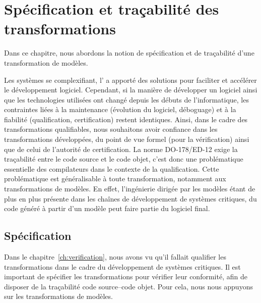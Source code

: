 \chapter{Spécification et traçabilité des transformations}
\label{ch:traceability}

Dans ce chapitre, nous abordons la notion de spécification et de traçabilité
d'une transformation de modèles.

Les systèmes se complexifiant, l'{\idm} a apporté des solutions pour faciliter
et accélérer le développement logiciel. Cependant, si la manière de développer
un logiciel ainsi que les technologies utilisées ont changé depuis les débuts
de l'informatique, les contraintes liées à la maintenance (évolution du
logiciel, déboguage) et à la fiabilité (qualification, certification)
restent identiques. 
Ainsi, dans le cadre des transformations qualifiables, nous souhaitons avoir
confiance dans les transformations développées, du point de vue formel (pour la
vérification) ainsi que de celui de l'autorité de certification. La norme
DO-178/ED-12 exige la traçabilité entre le code source et le code objet, c'est
donc une problématique essentielle des compilateurs dans le contexte de la
qualification. Cette problématique est généralisable à toute transformation,
notamment aux transformations de modèles. En effet, l'ingénierie dirigée par
les modèles étant de plus en plus présente dans les chaînes de développement de
systèmes critiques, du code généré à partir d'un modèle peut faire partie du
logiciel final.



\section{Spécification}

Dans le chapitre~\ref{ch:verification}, nous avons vu qu'il fallait qualifier
les transformations dans le cadre du développement de systèmes critiques. Il
est important de spécifier les transformations pour vérifier leur conformité,
afin de disposer de la traçabilité code source--code objet. Pour cela, nous
nous appuyons sur les transformations de modèles. %

